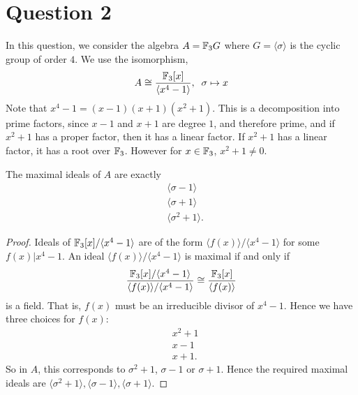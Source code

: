 \documentclass{unswmaths}
\begin{document}
\section*{Question 2}
In this question, we consider the algebra $A = {\mathbb{F}_3} G$ where $G = \langle \sigma\rangle$
is the cyclic group of order $4$. We use the isomorphism,
\begin{equation*}
    A\cong \frac{{\mathbb{F}_3}[x]}{\langle x^4-1\rangle},\;\; \sigma\mapsto x
\end{equation*}
Note that $x^4-1 = (x-1)(x+1)(x^2+1)$. This is a decomposition into prime factors,
since $x-1$ and $x+1$ are degree $1$, and therefore prime, and if $x^2+1$ has a proper factor,
then it has a linear factor. If $x^2+1$ has a linear factor, it has a root over ${\mathbb{F}_3}$. However
for $x \in {\mathbb{F}_3}$, $x^2+1\neq 0$.

\begin{lemma}
    The maximal ideals of $A$ are exactly
    \begin{align*}
        &\langle \sigma-1\rangle\\
        &\langle \sigma+1\rangle\\
        &\langle \sigma^2+1\rangle.
    \end{align*}
\end{lemma}
\begin{proof}
    Ideals of ${\mathbb{F}_3}[x]/\langle x^4-1\rangle$ are of the form $\langle f(x)\rangle/\langle x^4-1\rangle$
    for some $f(x)|x^4-1$. An ideal $\langle f(x) \rangle/\langle x^4-1\rangle$ is maximal
    if and only if
    \begin{equation*}
        \frac{{\mathbb{F}_3}[x]/\langle x^4-1\rangle}{\langle f(x)\rangle/\langle x^4-1\rangle} \cong \frac{{\mathbb{F}_3}[x]}{\langle f(x)\rangle}
    \end{equation*}
    is a field. That is, $f(x)$ must be an irreducible divisor of $x^4-1$. Hence we
    have three choices for $f(x)$:
    \begin{align*}
        &x^2+1\\
        &x-1\\
        &x+1.
    \end{align*}
    So in $A$, this corresponds to $\sigma^2+1$, $\sigma-1$ or $\sigma+1$. Hence the required
    maximal ideals are $\langle \sigma^2+1\rangle,\langle\sigma-1\rangle,\langle \sigma+1\rangle$. 
\end{proof}
\end{document}
